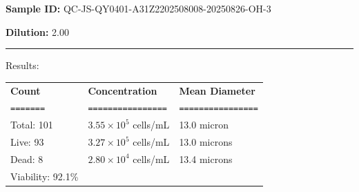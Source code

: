\documentclass[UTF8,10pt,a4paper,fontset=fandol]{ctexart}
\renewcommand{\arraystretch}{1.15}
\newcommand{\fieldvalue}[1]{#1}
\begin{document}
\vspace{0.8em}

\noindent\textbf{Sample ID: }
\fieldvalue{QC-JS-QY0401-A31Z2202508008-20250826-OH-3}

\noindent\textbf{Dilution: }
\fieldvalue{2.00}

\vspace{0.6em}
\noindent\rule{\textwidth}{0.4pt}

\noindent Results:

\vspace{0.5em}

\renewcommand{\arraystretch}{1.15}
\begin{tabularx}{\textwidth}{@{}X X X@{}}
\textbf{Count} & \textbf{Concentration} & \textbf{Mean Diameter} \\
\texttt{=======} & \texttt{================} & \texttt{================} \\

Total:
\fieldvalue{101}
&
\fieldvalue{$3.55{\times}10^{5}$ cells/mL}
&
\fieldvalue{13.0 micron}
\\

Live:
\fieldvalue{93}
&
\fieldvalue{$3.27{\times}10^{5}$ cells/mL}
&
\fieldvalue{13.0 microns}
\\

Dead:
\fieldvalue{8}
&
\fieldvalue{$2.80{\times}10^{4}$ cells/mL}
&
\fieldvalue{13.4 microns}
\\

Viability:
\fieldvalue{92.1\%}
&
&
\end{tabularx}

\vspace{1.5em}
\end{document}
